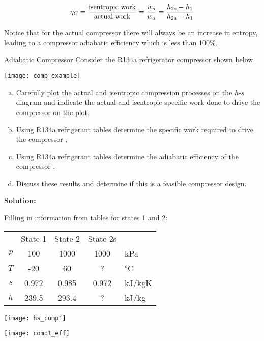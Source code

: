 \begin{equation}\label{eq:comp_eff}
  \eta_C = \frac{\rm isentropic\ work}{\rm actual\ work} = \frac{w_s}{w_a} = \frac{h_{2s} - h_{1}}{h_{2a} - h_{1}}
\end{equation}

Notice that for the actual compressor there will always be an increase in entropy, leading to a compressor adiabatic efficiency which is less than 100\%.

\begin{example}{Adiabatic Compressor}
  Consider the R134a refrigerator compressor shown below.
  \begin{center}
    \texttt{[image: comp\_example]}
  \end{center}

  \begin{enumerate}[a)]
  \item Carefully plot the actual and isentropic compression processes on the $h$-$s$ diagram and indicate the actual and isentropic specific work done to drive the compressor on the plot.
  \item Using R134a refrigerant tables determine the specific work required to drive the compressor \answer{[53.9 kJ/kg]}.
  \item Using R134a refrigerant tables determine the adiabatic efficiency of the compressor \answer{[$\eta_C$ = 92\%]}.
  \item Discuss these results and determine if this is a feasible compressor design.
  \end{enumerate}
  {\bf Solution:}

  Filling in information from tables for states 1 and 2:
  \begin{center}
    \def\arraystretch{1.5}
    \begin{tabular}{r|c|c|c|l}
       & State 1 & State 2 & State 2s & \\ \cline{2-4}
      $p$ & 100 & 1000 & 1000 & kPa \\ \cline{2-4}
      $T$ & -20 & 60 & ? & °C \\ \cline{2-4}
      $s$ & 0.972 & 0.985 & 0.972 & kJ/kgK \\ \cline{2-4}
      $h$ & 239.5 & 293.4 & ? & kJ/kg
    \end{tabular}
    \def\arraystretch{1.0}
  \end{center}
  
  \begin{center}
    \texttt{[image: hs\_comp1]}
  \end{center}
  
  \begin{center}
    \texttt{[image: comp1\_eff]}
  \end{center}
  
\end{example}

